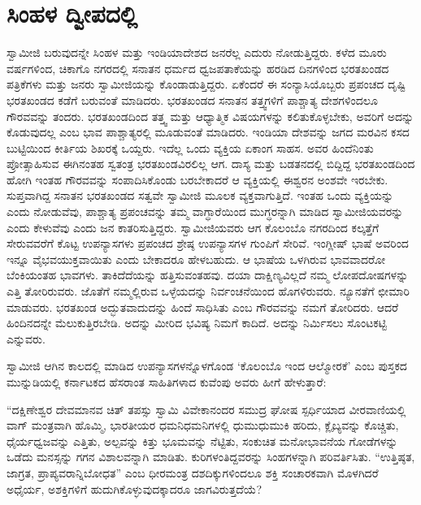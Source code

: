 
\chapter{ಸಿಂಹಳ ದ್ವೀಪದಲ್ಲಿ}

 ಸ್ವಾಮೀಜಿ ಬರುವುದನ್ನೇ ಸಿಂಹಳ ಮತ್ತು ಇಂಡಿಯಾದೇಶದ ಜನರೆಲ್ಲ ಎದುರು ನೋಡುತ್ತಿದ್ದರು. ಕಳೆದ ಮೂರು ವರ್ಷಗಳಿಂದ, ಚಿಕಾಗೊ ನಗರದಲ್ಲಿ ಸನಾತನ ಧರ್ಮದ ಧ್ವಜಪತಾಕೆಯನ್ನು ಹರಡಿದ ದಿನಗಳಿಂದ ಭರತಖಂಡದ ಪತ್ರಿಕೆಗಳು ಮತ್ತು ಜನರು ಸ್ವಾಮೀಜಿಯನ್ನು ಕೊಂಡಾಡುತ್ತಿದ್ದರು. ಏಕೆಂದರೆ ಈ ಸಂನ್ಯಾಸಿಯೊಬ್ಬರು ಪ್ರಪಂಚದ ದೃಷ್ಟಿ ಭರತಖಂಡದ ಕಡೆಗೆ ಬರುವಂತೆ ಮಾಡಿದರು. ಭರತಖಂಡದ ಸನಾತನ ತತ್ತ್ವಗಳಿಗೆ ಪಾಶ್ಚಾತ್ಯ ದೇಶಗಳಿಂದಲೂ ಗೌರವವನ್ನು ತಂದರು. ಭರತಖಂಡದಿಂದ ತತ್ತ್ವ ಮತ್ತು ಆಧ್ಯಾತ್ಮಿಕ ವಿಷಯಗಳನ್ನು ಕಲಿತುಕೊಳ್ಳಬೇಕು, ಅವರಿಗೆ ಅದನ್ನು ಕೊಡುವುದಲ್ಲ ಎಂಬ ಭಾವ ಪಾಶ್ಚಾತ್ಯರಲ್ಲಿ ಮೂಡುವಂತೆ ಮಾಡಿದರು. ಇಂಡಿಯಾ ದೇಶವನ್ನು ಜಗದ ಮರವಿನ ಕಸದ ಬುಟ್ಟಿಯಿಂದ ಕೀರ್ತಿಯ ಶಿಖರಕ್ಕೆ ಒಯ್ದರು. ಇದೆಲ್ಲ ಒಂದು ವ್ಯಕ್ತಿಯ ಏಕಾಂಗ ಸಾಹಸ. ಅವರ ಹಿಂದೆನಿಂತು ಪ್ರೋತ್ಸಾಹಿಸುವ ಈಗಿನಂತಹ ಸ್ವತಂತ್ರ ಭರತಖಂಡವಿರಲಿಲ್ಲ ಆಗ. ದಾಸ್ಯ ಮತ್ತು ಬಡತನದಲ್ಲಿ ಬಿದ್ದಿದ್ದ ಭರತಖಂಡದಿಂದ ಹೋಗಿ ಇಂತಹ ಗೌರವವನ್ನು ಸಂಪಾದಿಸಿಕೊಂಡು ಬರಬೇಕಾದರೆ ಆ ವ್ಯಕ್ತಿಯಲ್ಲಿ ಈಶ್ವರನ ಅಂಶವೇ ಇರಬೇಕು. ಸುಪ್ತವಾಗಿದ್ದ ಸನಾತನ ಭರತಖಂಡದ ಸತ್ವವೇ ಸ್ವಾಮೀಜಿ ಮೂಲಕ ವ್ಯಕ್ತವಾಗುತ್ತಿದೆ. ಇಂತಹ ಒಂದು ವ್ಯಕ್ತಿಯನ್ನು ಎಂದು ನೋಡುವೆವು, ಪಾಶ್ಚಾತ್ಯ ಪ್ರಪಂಚವನ್ನು ತಮ್ಮ ವಾಗ್ಧಾರೆಯಿಂದ ಮುಗ್ಧರನ್ನಾಗಿ ಮಾಡಿದ ಸ್ವಾಮೀಜಿಯವರನ್ನು ಎಂದು ಕೇಳುವೆವು ಎಂದು ಜನ ಕಾತರಿಸುತ್ತಿದ್ದರು. ಸ್ವಾಮೀಜಿಯವರು ಆಗ ಕೊಲಂಬೊ ನಗರದಿಂದ ಕಲ್ಕತ್ತೆಗೆ ಸೇರುವವರೆಗೆ ಕೊಟ್ಟ ಉಪನ್ಯಾಸಗಳು ಪ್ರಪಂಚದ ಶ್ರೇಷ್ಠ ಉಪನ್ಯಾಸಗಳ ಗುಂಪಿಗೆ ಸೇರಿವೆ. ಇಂಗ್ಲೀಷ್ ಭಾಷೆ ಅವರಿಂದ ಇನ್ನೂ ವೈಭವಯುಕ್ತವಾಯಿತು ಎಂದು ಬೇಕಾದರೂ ಹೇಳಬಹುದು. ಆ ಭಾಷೆಯ ಒಳಗಿರುವ ಭಾವವಾದರೋ‌ ಬೆಂಕಿಯಂತಹ ಭಾವಗಳು. ತಾಕಿದೆದೆಯನ್ನು ಹತ್ತಿಸುವಂತಹವು. ದಯಾ ದಾಕ್ಷಿಣ್ಯವಿಲ್ಲದೆ ನಮ್ಮ ಲೋಪದೋಷಗಳನ್ನು ಎತ್ತಿ ತೋರಿರುವರು. ಜೊತೆಗೆ ನಮ್ಮಲ್ಲಿರುವ ಒಳ್ಳೆಯದನ್ನು ನಿರ್ವಂಚನೆಯಿಂದ ಹೊಗಳಿರುವರು. ನ್ಯೂನತೆಗೆ ಛೀಮಾರಿ ಮಾಡುವರು. ಭರತಖಂಡ ಅದ್ಭುತವಾದುದನ್ನು ಹಿಂದೆ ಸಾಧಿಸಿತು ಎಂಬ ಗೌರವವನ್ನು ನಮಗೆ ತೋರಿದರು. ಆದರೆ ಹಿಂದಿನದನ್ನೇ ಮೆಲುಕುತ್ತಿರಬೇಡಿ. ಅದನ್ನು ಮೀರಿದ ಭವಿಷ್ಯ ನಿಮಗೆ ಕಾದಿದೆ. ಅದನ್ನು ನಿರ್ಮಿಸಲು ಸೊಂಟಕಟ್ಟಿ ಎನ್ನುವರು. 

 ಸ್ವಾಮೀಜಿ ಆಗಿನ ಕಾಲದಲ್ಲಿ ಮಾಡಿದ ಉಪನ್ಯಾಸಗಳನ್ನೊಳಗೊಂಡ ‘ಕೊಲಂಬೊ ಇಂದ ಆಲ್ಮೋರಕೆ’ ಎಂಬ ಪುಸ್ತಕದ ಮುನ್ನುಡಿಯಲ್ಲಿ ಕರ್ನಾಟಕದ ಹೆಸರಾಂತ ಸಾಹಿತಿಗಳಾದ ಕುವೆಂಪು ಅವರು ಹೀಗೆ ಹೇಳುತ್ತಾರೆ: 

 “ದಕ್ಷಿಣೇಶ್ವರ ದೇವಮಾನವ ಚಿತ್ ತಪಸ್ಸು ಸ್ವಾಮಿ ವಿವೇಕಾನಂದರ ಸಮುದ್ರ ಘೋಷ ಸ್ಪರ್ಧಿಯಾದ ವೀರವಾಣಿಯಲ್ಲಿ ವಾಗ್ ಮಂತ್ರವಾಗಿ ಹೊಮ್ಮಿ, ಭಾರತೀಯರ ಧಮನಿಧಮನಿಗಳಲ್ಲಿ ಧುಮುಧುಮುಕಿ ಹರಿದು, ಕ್ಲೈಬ್ಯವನ್ನು ಕೊಚ್ಚಿತು, ಧೈರ್ಯಧ್ವಜವನ್ನು ಎತ್ತಿತು, ಅಲ್ಪವನ್ನು ಕಿತ್ತು ಭೂಮವನ್ನು ನೆಟ್ಟಿತು, ಸಂಕುಚಿತ ಮನೋಭಾವನೆಯ ಗೋಡೆಗಳನ್ನು ಒಡೆದು ಮನಸ್ಸನ್ನು ಗಗನ ವಿಶಾಲವನ್ನಾಗಿ ಮಾಡಿತು. ಕುರಿಗಳಂತಿದ್ದವರನ್ನು ಸಿಂಹಗಳನ್ನಾಗಿ ಪರಿವರ್ತಿಸಿತು. “ಉತ್ತಿಷ್ಠತ, ಜಾಗ್ರತ, ಪ್ರಾಪ್ಯವರಾನ್ನಿಬೋಧತ” ಎಂಬ ಧೀರಮಂತ್ರ ದಶದಿಕ್ಕುಗಳಿಂದಲೂ ಶಕ್ತಿ ಸಂಚಾರಕವಾಗಿ ಮೊಳಗಿದರೆ ಅಧೈರ್ಯ, ಅಶಕ್ತಿಗಳಿಗೆ ಹುದುಗಿಕೊಳ್ಳುವುದಕ್ಕಾದರೂ ಜಾಗವಿರುತ್ತದೆಯೆ? 

